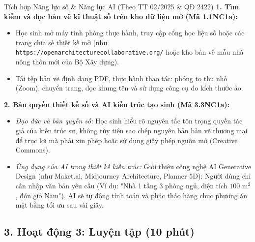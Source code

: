 \documentclass[12pt, a4paper]{article}
\begin{document}
\begin{aibox}{Tích hợp Năng lực số \& Năng lực AI (Theo TT 02/2025 \& QĐ 2422)}
    \textbf{1. Tìm kiếm và đọc bản vẽ kĩ thuật số trên kho dữ liệu mở (Mã 1.1NC1a):}
    \begin{itemize}[leftmargin=0.6cm]
        \item Học sinh mở máy tính phòng thực hành, truy cập cổng học liệu số hoặc các trang chia sẻ thiết kế mở (như \texttt{https://openarchitecturecollaborative.org/} hoặc kho bản vẽ mẫu nhà nông thôn mới của Bộ Xây dựng).
        \item Tải tệp bản vẽ định dạng PDF, thực hành thao tác: phóng to thu nhỏ (Zoom), chuyển trang, đọc khung tên và sử dụng công cụ đo kích thước ảo.
    \end{itemize}
    \textbf{2. Bản quyền thiết kế số và AI kiến trúc tạo sinh (Mã 3.3NC1a):}
    \begin{itemize}[leftmargin=0.6cm]
        \item \textit{Đạo đức và bản quyền số:} Học sinh hiểu rõ nguyên tắc tôn trọng quyền tác giả của kiến trúc sư, không tùy tiện sao chép nguyên bản bản vẽ thương mại để trục lợi mà phải xin phép hoặc sử dụng giấy phép nguồn mở (Creative Commons).
        \item \textit{Ứng dụng của AI trong thiết kế kiến trúc:} Giới thiệu công nghệ AI Generative Design (như Maket.ai, Midjourney Architecture, Planner 5D): Người dùng chỉ cần nhập văn bản yêu cầu (Ví dụ: "Nhà 1 tầng 3 phòng ngủ, diện tích $100\text{ m}^2$, đón gió Nam"), AI sẽ tự động tính toán và phác thảo hàng chục phương án mặt bằng tối ưu sau vài giây.
    \end{itemize}
\end{aibox}

\subsection*{3. Hoạt động 3: Luyện tập (10 phút)}
\end{document}
